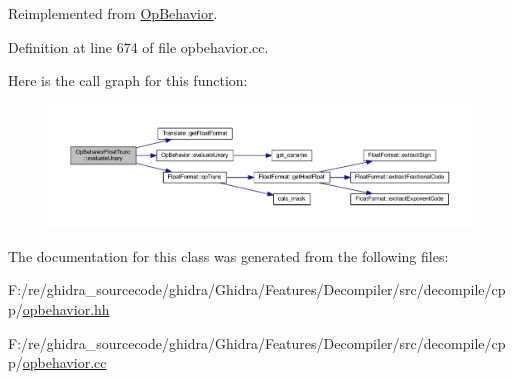 Reimplemented from \mbox{\hyperlink{class_op_behavior_acd4f5a1c0dee0414f3c541620b88fe45}{Op\+Behavior}}.



Definition at line 674 of file opbehavior.\+cc.

Here is the call graph for this function\+:
\nopagebreak
\begin{figure}[H]
\begin{center}
\leavevmode
\includegraphics[width=350pt]{class_op_behavior_float_trunc_adccaabdda58924e02be946eabeaffe3f_cgraph}
\end{center}
\end{figure}


The documentation for this class was generated from the following files\+:\begin{DoxyCompactItemize}
\item 
F\+:/re/ghidra\+\_\+sourcecode/ghidra/\+Ghidra/\+Features/\+Decompiler/src/decompile/cpp/\mbox{\hyperlink{opbehavior_8hh}{opbehavior.\+hh}}\item 
F\+:/re/ghidra\+\_\+sourcecode/ghidra/\+Ghidra/\+Features/\+Decompiler/src/decompile/cpp/\mbox{\hyperlink{opbehavior_8cc}{opbehavior.\+cc}}\end{DoxyCompactItemize}
